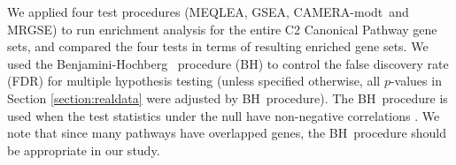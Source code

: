 \documentclass[a4,center,fleqn]{NAR}
\newcommand{\OurMethod}{MEQLEA}
\newcommand{\CMT}{CAMERA-modt}
\newcommand{\genr}{MRGSE}
\newcommand{\FDR}{Benjamini-Hochberg}
\newcommand{\FDRabb}{BH}
\begin{document}
	
	We applied four test procedures (\OurMethod, GSEA, \CMT~and \genr) to run enrichment analysis for
	the entire C2 Canonical Pathway gene sets, and compared the four tests in terms of resulting
	enriched gene sets. %
	We used the \FDR~\citep{benjamini1995controlling} procedure (\FDRabb) to control the false
	discovery rate (FDR) for multiple hypothesis testing (unless specified otherwise, all $p$-values in
	Section \ref{section:realdata} were adjusted by \FDRabb~procedure). The \FDRabb~procedure is used
	when the test statistics under the null have non-negative correlations \citep{benjamini2001control}.
	We note that since many pathways have overlapped genes, the \FDRabb~procedure should be appropriate
	in our study.
	
\end{document}
